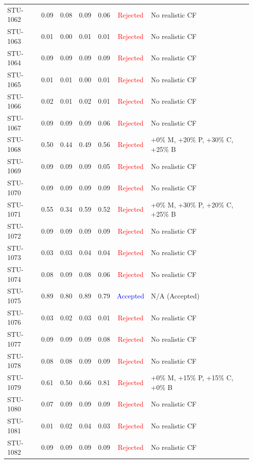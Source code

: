 \begin{longtable}{l c c c c | c | l}
STU-1062 & 0.09 & 0.08 & 0.09 & 0.06 & \textcolor{red}{Rejected} & No realistic CF \\
STU-1063 & 0.01 & 0.00 & 0.01 & 0.01 & \textcolor{red}{Rejected} & No realistic CF \\
STU-1064 & 0.09 & 0.09 & 0.09 & 0.09 & \textcolor{red}{Rejected} & No realistic CF \\
STU-1065 & 0.01 & 0.01 & 0.00 & 0.01 & \textcolor{red}{Rejected} & No realistic CF \\
STU-1066 & 0.02 & 0.01 & 0.02 & 0.01 & \textcolor{red}{Rejected} & No realistic CF \\
STU-1067 & 0.09 & 0.09 & 0.09 & 0.06 & \textcolor{red}{Rejected} & No realistic CF \\
STU-1068 & 0.50 & 0.44 & 0.49 & 0.56 & \textcolor{red}{Rejected} & +0\% M, +20\% P, +30\% C, +25\% B \\
STU-1069 & 0.09 & 0.09 & 0.09 & 0.05 & \textcolor{red}{Rejected} & No realistic CF \\
STU-1070 & 0.09 & 0.09 & 0.09 & 0.09 & \textcolor{red}{Rejected} & No realistic CF \\
STU-1071 & 0.55 & 0.34 & 0.59 & 0.52 & \textcolor{red}{Rejected} & +0\% M, +30\% P, +20\% C, +25\% B \\
STU-1072 & 0.09 & 0.09 & 0.09 & 0.09 & \textcolor{red}{Rejected} & No realistic CF \\
STU-1073 & 0.03 & 0.03 & 0.04 & 0.04 & \textcolor{red}{Rejected} & No realistic CF \\
STU-1074 & 0.08 & 0.09 & 0.08 & 0.06 & \textcolor{red}{Rejected} & No realistic CF \\
STU-1075 & 0.89 & 0.80 & 0.89 & 0.79 & \textcolor{blue}{Accepted} & N/A (Accepted) \\
STU-1076 & 0.03 & 0.02 & 0.03 & 0.01 & \textcolor{red}{Rejected} & No realistic CF \\
STU-1077 & 0.09 & 0.09 & 0.09 & 0.08 & \textcolor{red}{Rejected} & No realistic CF \\
STU-1078 & 0.08 & 0.08 & 0.09 & 0.09 & \textcolor{red}{Rejected} & No realistic CF \\
STU-1079 & 0.61 & 0.50 & 0.66 & 0.81 & \textcolor{red}{Rejected} & +0\% M, +15\% P, +15\% C, +0\% B \\
STU-1080 & 0.07 & 0.09 & 0.09 & 0.09 & \textcolor{red}{Rejected} & No realistic CF \\
STU-1081 & 0.01 & 0.02 & 0.04 & 0.03 & \textcolor{red}{Rejected} & No realistic CF \\
STU-1082 & 0.09 & 0.09 & 0.09 & 0.09 & \textcolor{red}{Rejected} & No realistic CF \\

\end{longtable}
